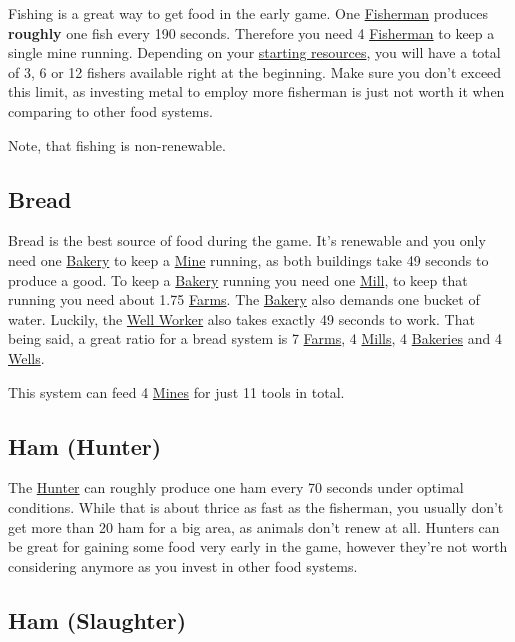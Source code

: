 \documentclass[11pt]{article}
\begin{document}
Fishing is a great way to get food in the early game. One \hyperref[fisherman]{Fisherman} produces \textbf{roughly} one fish every 190 seconds. Therefore you need 4 \hyperref[fisherman]{Fisherman} to keep a single mine running. Depending on your \hyperref[startresources]{starting resources}, you will have a total of 3, 6 or 12 fishers available right at the beginning. Make sure you don't exceed this limit, as investing metal to employ more fisherman is just not worth it when comparing to other food systems.

Note, that fishing is non-renewable.

\subsection{Bread}
\label{sec:bread}

Bread is the best source of food during the game. It's renewable and you only need one \hyperref[bakery]{Bakery} to keep a \hyperref[mine]{Mine} running, as both buildings take 49 seconds to produce a good. To keep a \hyperref[bakery]{Bakery} running you need one \hyperref[mill]{Mill}, to keep that running you need about 1.75 \hyperref[farm]{Farms}. The \hyperref[bakery]{Bakery} also demands one bucket of water. Luckily, the \hyperref[well]{Well Worker} also takes exactly 49 seconds to work. That being said, a great ratio for a bread system is 7 \hyperref[farm]{Farms}, 4 \hyperref[mill]{Mills}, 4 \hyperref[bakery]{Bakeries} and 4 \hyperref[well]{Wells}.

This system can feed 4 \hyperref[mine]{Mines} for just 11 tools in total.

\subsection{Ham (Hunter)}
\label{sec:hamhunter}

The  \hyperref[hunter]{Hunter} can roughly produce one ham every 70 seconds under optimal conditions. While that is about thrice as fast as the fisherman, you usually don't get more than 20 ham for a big area, as animals don't renew at all. Hunters can be great for gaining some food very early in the game, however they're not worth considering anymore as you invest in other food systems.

\subsection{Ham (Slaughter)}
\label{sec:hamslaughter}
\end{document}
